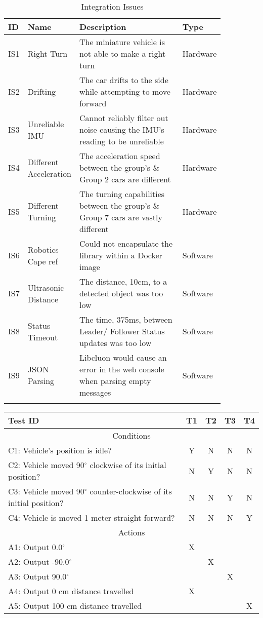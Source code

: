 \documentclass[12pt]{article}
\begin{document}
\begin{appendices}
\begin{longtable}{ | p{0.05\linewidth} | p{0.15\linewidth} | p{0.5\linewidth} | p{0.15\linewidth} | }\hline
    ID & Name & Description & Type \\ \hline
   	IS1 & Right Turn & The miniature vehicle is not able to make a right turn & Hardware\\ \hline
   	IS2 & Drifting & The car drifts to the side while attempting to move forward & Hardware\\ \hline
	IS3 & Unreliable IMU & Cannot reliably filter out noise causing the IMU's reading to be unreliable & Hardware\\ \hline
	IS4 & Different Acceleration & The acceleration speed between the group's \& Group 2 cars are different & Hardware\\ \hline
	IS5 & Different Turning & The turning capabilities between the group's \& Group 7 cars are vastly different & Hardware\\ \hline
	IS6 & Robotics Cape {ref} & Could not encapsulate the library within a Docker image & Software\\ \hline
	IS7 & Ultrasonic Distance & The distance, 10cm, to a detected object was too low & Software\\ \hline
	IS8 & Status Timeout & The time, 375ms, between Leader/ Follower Status updates was too low& Software\\ \hline
	IS9 & JSON Parsing & Libcluon would cause an error in the web console when parsing empty messages & Software\\ \hline
\caption{Integration Issues}
\label{issue table}
\end{longtable}
\pagebreak

\begin{center}
\begin{tabular}{ |l|c|c|c|c| } 
 \hline
 \textbf{Test ID} & T1 & T2 & T3 & T4 \\ 
 \hline\hline
 \multicolumn{5}{|c|}{ Conditions} \\
 \hline
 C1: Vehicle's position is idle? & Y & N & N & N \\
 \hline
 C2: Vehicle moved 90$^{\circ}$ clockwise of its initial position? & N & Y & N &N \\
 \hline
 C3: Vehicle moved 90$^{\circ}$ counter-clockwise of its initial position? & N & N & Y & N \\
 \hline
 C4: Vehicle is moved 1 meter straight forward? &N &N &N & Y \\
 \hline
 \multicolumn{5}{|c|}{Actions} \\
 \hline
 A1: Output 0.0$^{\circ}$ 	& X	&  	& 	& \\
 \hline
 A2: Output -90.0$^{\circ}$ &  	& X & 	& \\
 \hline
 A3: Output 90.0$^{\circ}$ 	&  &  & X 	& \\
 \hline
 A4: Output 0 cm distance travelled & X &  & & \\
 \hline
 A5: Output 100 cm distance travelled & &  & & X \\
 \hline
\end{tabular}
\label{tab:IMUDT}
\end{center}


\end{appendices}
\end{document}
